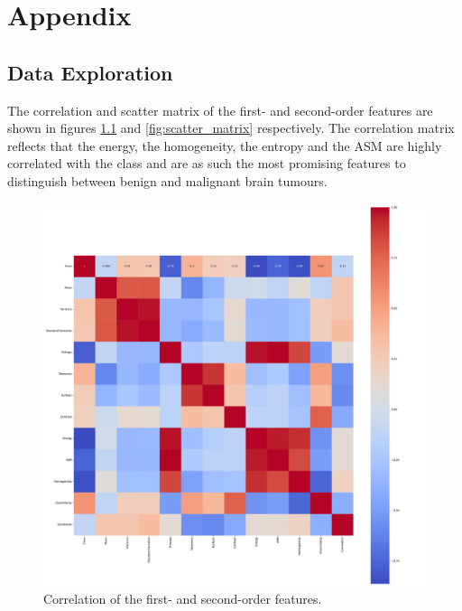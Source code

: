 \chapter{Appendix}
\label{cha:appendix}

\section{Data Exploration}
\label{sec:DataExploration}


The correlation and scatter matrix of the first- and second-order features are shown in figures \ref{fig:correlation} and \ref{fig:scatter_matrix} respectively.
The correlation matrix reflects that the energy, the homogeneity, the entropy and the ASM are highly correlated with the class and are as such the most promising features to distinguish between benign and malignant brain tumours.

\begin{figure}[H]
    \centering
    \includegraphics[width=.8\textwidth]{plots/correlation.pdf}
    \caption{Correlation of the first- and second-order features.}
    \label{fig:correlation}
\end{figure}

